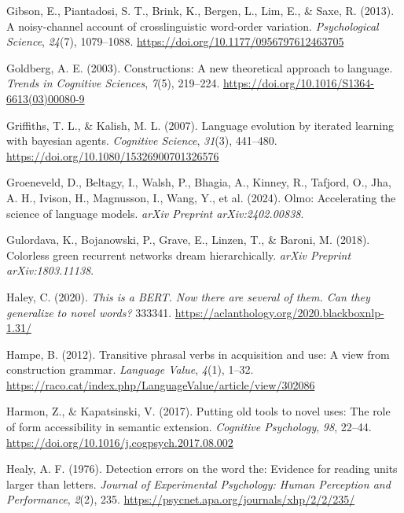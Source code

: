 \documentclass[
  12pt,
  letterpaper,
]{scrreprt}
\newlength{\cslhangindent}
\newenvironment{CSLReferences}[2] %
 {\begin{list}{}{%
  \setlength{\itemindent}{0pt}
  \setlength{\leftmargin}{0pt}
  \setlength{\parsep}{0pt}
  \ifodd #1
   \setlength{\leftmargin}{\cslhangindent}
   \setlength{\itemindent}{-1\cslhangindent}
  \fi
  \setlength{\itemsep}{#2\baselineskip}}}
 {\end{list}}
\begin{document}
\begin{CSLReferences}{1}{0}
Gibson, E., Piantadosi, S. T., Brink, K., Bergen, L., Lim, E., \& Saxe,
R. (2013). A noisy-channel account of crosslinguistic word-order
variation. \emph{Psychological Science}, \emph{24}(7), 1079--1088.
\url{https://doi.org/10.1177/0956797612463705}

Goldberg, A. E. (2003). Constructions: A new theoretical approach to
language. \emph{Trends in Cognitive Sciences}, \emph{7}(5), 219--224.
\url{https://doi.org/10.1016/S1364-6613(03)00080-9}

Griffiths, T. L., \& Kalish, M. L. (2007). Language evolution by
iterated learning with bayesian agents. \emph{Cognitive Science},
\emph{31}(3), 441--480. \url{https://doi.org/10.1080/15326900701326576}

Groeneveld, D., Beltagy, I., Walsh, P., Bhagia, A., Kinney, R., Tafjord,
O., Jha, A. H., Ivison, H., Magnusson, I., Wang, Y., et al. (2024).
Olmo: Accelerating the science of language models. \emph{arXiv Preprint
arXiv:2402.00838}.

Gulordava, K., Bojanowski, P., Grave, E., Linzen, T., \& Baroni, M.
(2018). Colorless green recurrent networks dream hierarchically.
\emph{arXiv Preprint arXiv:1803.11138}.

Haley, C. (2020). \emph{This is a BERT. Now there are several of them.
Can they generalize to novel words?} 333341.
\url{https://aclanthology.org/2020.blackboxnlp-1.31/}

Hampe, B. (2012). Transitive phrasal verbs in acquisition and use: A
view from construction grammar. \emph{Language Value}, \emph{4}(1),
1--32.
\url{https://raco.cat/index.php/LanguageValue/article/view/302086}

Harmon, Z., \& Kapatsinski, V. (2017). Putting old tools to novel uses:
The role of form accessibility in semantic extension. \emph{Cognitive
Psychology}, \emph{98}, 22--44.
\url{https://doi.org/10.1016/j.cogpsych.2017.08.002}

Healy, A. F. (1976). Detection errors on the word the: Evidence for
reading units larger than letters. \emph{Journal of Experimental
Psychology: Human Perception and Performance}, \emph{2}(2), 235.
\url{https://psycnet.apa.org/journals/xhp/2/2/235/}


\end{CSLReferences}
\end{document}
